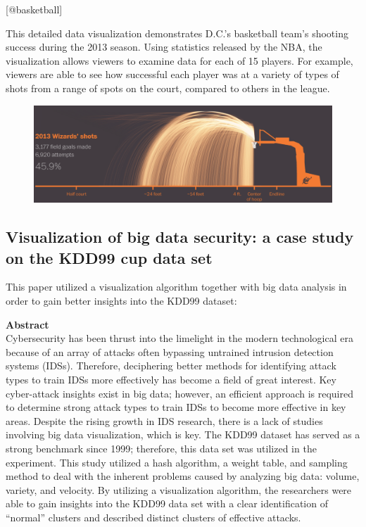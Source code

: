 \documentclass[]{book}
\theoremstyle{definition}
\theoremstyle{definition}
\theoremstyle{definition}
\theoremstyle{remark}
\begin{document}
{[}@basketball{]}

This detailed data visualization demonstrates D.C.'s basketball team's
shooting success during the 2013 season. Using statistics released by
the NBA, the visualization allows viewers to examine data for each of 15
players. For example, viewers are able to see how successful each player
was at a variety of types of shots from a range of spots on the court,
compared to others in the league.

\begin{figure}
\centering
\includegraphics{images/wizards_shooting.png}
\caption{}
\end{figure}

\subsection{Visualization of big data security: a case study on the
KDD99 cup data
set}\label{visualization-of-big-data-security-a-case-study-on-the-kdd99-cup-data-set}

This paper utilized a visualization algorithm together with big data
analysis in order to gain better insights into the KDD99 dataset:

\textbf{Abstract}\\
Cybersecurity has been thrust into the limelight in the modern
technological era because of an array of attacks often bypassing
untrained intrusion detection systems (IDSs). Therefore, deciphering
better methods for identifying attack types to train IDSs more
effectively has become a field of great interest. Key cyber-attack
insights exist in big data; however, an efficient approach is required
to determine strong attack types to train IDSs to become more effective
in key areas. Despite the rising growth in IDS research, there is a lack
of studies involving big data visualization, which is key. The KDD99
dataset has served as a strong benchmark since 1999; therefore, this
data set was utilized in the experiment. This study utilized a hash
algorithm, a weight table, and sampling method to deal with the inherent
problems caused by analyzing big data: volume, variety, and velocity. By
utilizing a visualization algorithm, the researchers were able to gain
insights into the KDD99 data set with a clear identification of
``normal'' clusters and described distinct clusters of effective
attacks.
\end{document}
